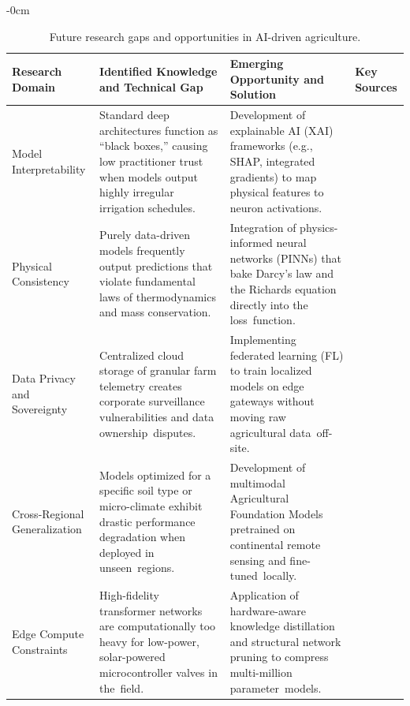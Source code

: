 \documentclass[land,review,accept,pdftex,oneauthor]{Definitions/mdpi}
\begin{document}
\begin{table}[H] 
\caption{Future %
 research gaps and opportunities in AI-driven agriculture. \label{tab:future_gaps}}

\small
\begin{adjustwidth}{-\extralength}{0cm}
\begin{minipage}{\fulllength}
\begin{tabularx}{\textwidth}{m{3cm}<{\raggedright}m{6cm}<{\raggedright}m{6cm}<{\raggedright}m{1.5cm}<{\raggedright}}
\toprule
Research Domain & Identified Knowledge and Technical Gap & Emerging Opportunity and Solution & Key Sources \\
\midrule

Model Interpretability %
 & 
Standard deep architectures function as ``black boxes,'' causing low practitioner trust when models output highly irregular irrigation schedules. & 
Development of explainable AI (XAI) frameworks (e.g., SHAP, integrated gradients) to map physical features to neuron activations. & 
\citep{Pai_2025} \\ 
\midrule

Physical Consistency & 
Purely data-driven models frequently output predictions that violate fundamental laws of thermodynamics and mass conservation. & 
Integration of physics-informed neural networks (PINNs) that bake Darcy's law and the Richards equation directly into the loss~function. & 
 \\ 
 \midrule

Data Privacy and Sovereignty & 
Centralized cloud storage of granular farm telemetry creates corporate surveillance vulnerabilities and data ownership~disputes. & 
Implementing federated learning (FL) to train localized models on edge gateways without moving raw agricultural data~off-site. & 
\citep{electronics14132512} \\ 
\midrule

Cross-Regional Generalization & 
Models optimized for a specific soil type or micro-climate exhibit drastic performance degradation when deployed in unseen~regions. & 
Development of multimodal Agricultural Foundation Models pretrained on continental remote sensing and fine-tuned~locally. & 
\\
\midrule

Edge Compute Constraints & 
High-fidelity transformer networks are computationally too heavy for low-power, solar-powered microcontroller valves in the~field. & 
Application of hardware-aware knowledge distillation and structural network pruning to compress multi-million parameter~models. & 
\\

\bottomrule
\end{tabularx}
\end{minipage}
\end{adjustwidth}
\end{table}
\end{document}
